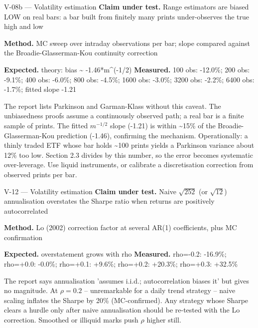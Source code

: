 \begin{caveat}{V-08b \; ---  Volatility estimation}
\textbf{Claim under test.} Range estimators are biased LOW on real bars: a bar built from finitely many prints under-observes the true high and low

\textbf{Method.} MC sweep over intraday observations per bar; slope compared against the Broadie-Glasserman-Kou continuity correction

\textbf{Expected.} theory: bias \textasciitilde{} -1.46*m\textasciicircum{}(-1/2) \quad \textbf{Measured.} 100 obs: -12.0\%; 200 obs: -9.1\%; 400 obs: -6.0\%; 800 obs: -4.5\%; 1600 obs: -3.0\%; 3200 obs: -2.2\%; 6400 obs: -1.7\%; fitted slope -1.21

The report lists Parkinson and Garman-Klass without this caveat. The unbiasedness proofs assume a continuously observed path; a real bar is a finite sample of prints. The fitted $m^{-1/2}$ slope (-1.21) is within \textasciitilde{}15\% of the Broadie-Glasserman-Kou prediction (-1.46), confirming the mechanism. Operationally: a thinly traded ETF whose bar holds \textasciitilde{}100 prints yields a Parkinson variance about 12\% too low. Section 2.3 divides by this number, so the error becomes systematic over-leverage. Use liquid instruments, or calibrate a discretisation correction from observed prints per bar.
\end{caveat}

\begin{caveat}{V-12 \; ---  Volatility estimation}
\textbf{Claim under test.} Naive $\sqrt{252}$ (or $\sqrt{12}$) annualisation overstates the Sharpe ratio when returns are positively autocorrelated

\textbf{Method.} Lo (2002) correction factor at several AR(1) coefficients, plus MC confirmation

\textbf{Expected.} overstatement grows with rho \quad \textbf{Measured.} rho=-0.2: -16.9\%; rho=+0.0: -0.0\%; rho=+0.1: +9.6\%; rho=+0.2: +20.3\%; rho=+0.3: +32.5\%

The report says annualisation 'assumes i.i.d.; autocorrelation biases it' but gives no magnitude. At $\rho=0.2$ -- unremarkable for a daily trend strategy -- naive scaling inflates the Sharpe by 20\% (MC-confirmed). Any strategy whose Sharpe clears a hurdle only after naive annualisation should be re-tested with the Lo correction. Smoothed or illiquid marks push $\rho$ higher still.
\end{caveat}

